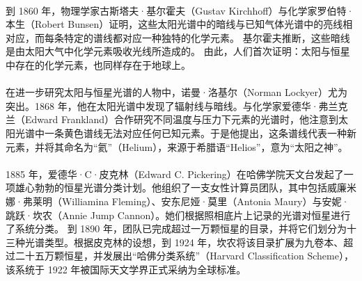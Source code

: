 \paragraph{}
到 1860 年，物理学家古斯塔夫·基尔霍夫（Gustav Kirchhoff）与化学家罗伯特·本生（Robert Bunsen）证明，这些太阳光谱中的暗线与已知气体光谱中的亮线相对应，而每条特定的谱线都对应一种独特的化学元素。\cite{ref16}  
基尔霍夫推断，这些暗线是由太阳大气中化学元素吸收光线所造成的。\cite{ref17}  
由此，人们首次证明：太阳与恒星中存在的化学元素，也同样存在于地球上。

\paragraph{}
在进一步研究太阳与恒星光谱的人物中，诺曼·洛基尔（Norman Lockyer）尤为突出。1868 年，他在太阳光谱中发现了辐射线与暗线。与化学家爱德华·弗兰克兰（Edward Frankland）合作研究不同温度与压力下元素的光谱时，他注意到太阳光谱中一条黄色谱线无法对应任何已知元素。于是他提出，这条谱线代表一种新元素，并将其命名为“氦”（Helium），来源于希腊语“Helios”，意为“太阳之神”。\cite{ref18,ref19}

\paragraph{}
1885 年，爱德华·C·皮克林（Edward C. Pickering）在哈佛学院天文台发起了一项雄心勃勃的恒星光谱分类计划。他组织了一支女性计算员团队，其中包括威廉米娜·弗莱明（Williamina Fleming）、安东尼娅·莫里（Antonia Maury）与安妮·跳跃·坎农（Annie Jump Cannon）。她们根据照相底片上记录的光谱对恒星进行了系统分类。  
到 1890 年，团队已完成超过一万颗恒星的目录，并将它们划分为十三种光谱类型。根据皮克林的设想，到 1924 年，坎农将该目录扩展为九卷本、超过二十五万颗恒星，并发展出“哈佛分类系统”（Harvard Classification Scheme），该系统于 1922 年被国际天文学界正式采纳为全球标准。\cite{ref20}
